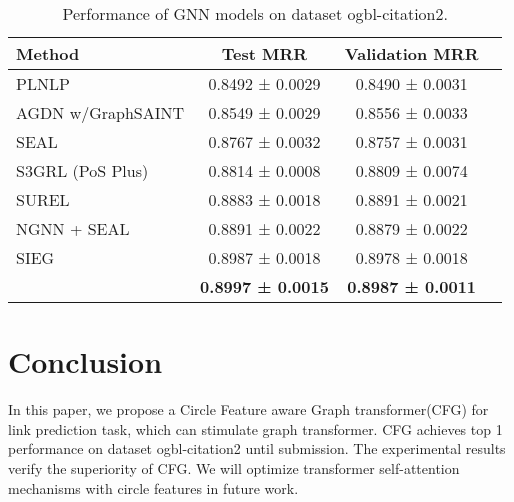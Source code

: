 \documentclass[sigconf]{acmart}
\begin{document}
\begin{table}[htbp]
    \centering
    \caption{Performance of GNN models on dataset ogbl-citation2.}\label{tab_citation2_result}
    \begin{tabular}{lccc}
    \hline
   Method                                    & Test MRR  & Validation MRR             \\ \hline
    PLNLP    & 0.8492 ± 0.0029          & 0.8490 ± 0.0031          \\
    AGDN w/GraphSAINT  & 0.8549 ± 0.0029          & 0.8556 ± 0.0033         \\
    SEAL                                & 0.8767 ± 0.0032          & 0.8757 ± 0.0031         \\
    
    S3GRL (PoS Plus)   &0.8814 ± 0.0008 & 0.8809 ± 0.0074 \\
    SUREL & 0.8883 ± 0.0018         & 0.8891 ± 0.0021        \\
    NGNN + SEAL       & 0.8891 ± 0.0022         & 0.8879 ± 0.0022          \\
    SIEG   & 0.8987 ± 0.0018 & 0.8978 ± 0.0018 \\  \hline
       & \textbf{0.8997 ± 0.0015} & \textbf{0.8987 ± 0.0011} \\
\hline
    \end{tabular}
\end{table}

\section{Conclusion}  \label{section_conclusion}
In this paper, we propose a Circle Feature aware Graph transformer(CFG) for link prediction task, which can stimulate graph transformer. CFG achieves top 1 performance on dataset ogbl-citation2 until submission. The experimental results verify the superiority of CFG. We will optimize transformer self-attention mechanisms with circle features in future work. 




\end{document}
